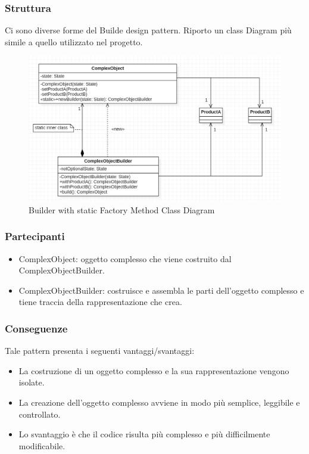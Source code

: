 \documentclass{article}
\begin{document}
\subsubsection{Struttura}
Ci sono diverse forme del Builde design pattern. Riporto un class Diagram più simile a quello utilizzato nel progetto.

\begin{figure} [H]
\begin{center}
\includegraphics[scale=0.5]{BuilderClass.png}
\end{center}
\caption{Builder with static Factory Method Class Diagram}
\end{figure}

\subsubsection{Partecipanti}
\begin{itemize}
  \item ComplexObject: oggetto complesso che viene costruito dal ComplexObjectBuilder.
  \item ComplexObjectBuilder: costruisce e assembla le parti dell'oggetto complesso e tiene traccia della rappresentazione che crea.
\end{itemize}

\subsubsection{Conseguenze}
Tale pattern presenta i seguenti vantaggi/svantaggi:
\begin{itemize}
  \item La costruzione di un oggetto complesso e la sua rappresentazione vengono isolate.
  \item La creazione dell'oggetto complesso avviene in modo più semplice, leggibile e controllato.
  \item Lo svantaggio è che il codice risulta più complesso e più difficilmente modificabile.
\end{itemize}
\newpage 
\end{document}

